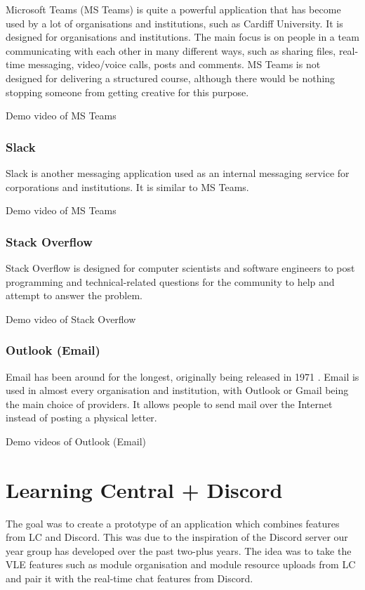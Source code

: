 Microsoft Teams (MS Teams) is quite a powerful application that has become used by a lot of organisations and institutions, such as Cardiff University. It is designed for organisations and institutions. The main focus is on people in a team communicating with each other in many different ways, such as sharing files, real-time messaging, video/voice calls, posts and comments. MS Teams is not designed for delivering a structured course, although there would be nothing stopping someone from getting creative for this purpose.

Demo video of MS Teams \cite{ms_teams_demo}

\subsubsection{Slack}

Slack is another messaging application used as an internal messaging service for corporations and institutions. It is similar to MS Teams.

Demo video of MS Teams \cite{Slack_demo}

\subsubsection{Stack Overflow}

Stack Overflow is designed for computer scientists and software engineers to post programming and technical-related questions for the community to help and attempt to answer the problem.

Demo video of Stack Overflow \cite{Stack_Overflow_demo}

\subsubsection{Outlook (Email)}

Email has been around for the longest, originally being released in 1971 \cite{email_release}. Email is used in almost every organisation and institution, with Outlook or Gmail being the main choice of providers. It allows people to send mail over the Internet instead of posting a physical letter.

Demo videos of Outlook (Email) \cite{Outlook_demo_1}\cite{Outlook_demo_2}

\section{Learning Central + Discord}
The goal was to create a prototype of an application which combines features from LC and Discord. This was due to the inspiration of the Discord server our year group has developed over the past two-plus years. The idea was to take the VLE features such as module organisation and module resource uploads from LC and pair it with the real-time chat features from Discord.
